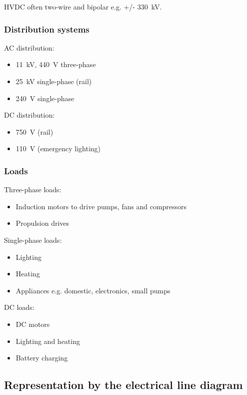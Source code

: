 \documentclass[class=report, crop=false, 12pt,a4paper]{standalone}
\begin{document}
HVDC often two-wire and bipolar e.g. +/- \SI{330}{\kilo\volt}.
\subsubsection{Distribution systems}
AC distribution:
\begin{itemize}
	\item \SI{11}{\kilo\volt}, \SI{440}{\volt} three-phase
	\item \SI{25}{\kilo\volt} single-phase (rail)
	\item \SI{240}{\volt} single-phase
\end{itemize}
DC distribution:
\begin{itemize}
	\item \SI{750}{\volt} (rail)
	\item \SI{110}{\volt} (emergency lighting)
\end{itemize}
\subsubsection{Loads}
Three-phase loads:
\begin{itemize}
	\item Induction motors to drive pumps, fans and compressors
	\item Propulsion drives
\end{itemize}
Single-phase loads:
\begin{itemize}
	\item Lighting
	\item Heating
	\item Appliances e.g. domestic, electronics, small pumps
\end{itemize}
DC loads:
\begin{itemize}
	\item DC motors
	\item Lighting and heating
	\item Battery charging
\end{itemize}
\subsection{Representation by the electrical line diagram}
\end{document}
